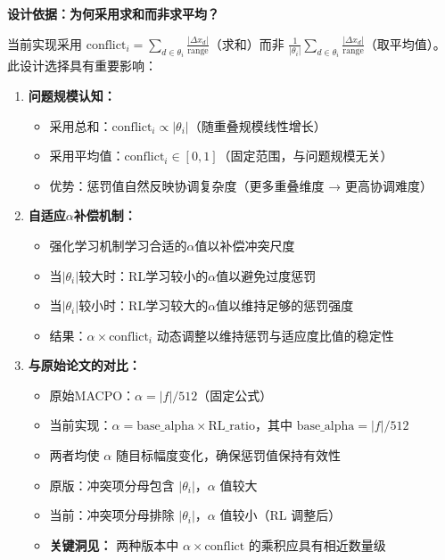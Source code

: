 \documentclass[11pt,a3paper]{ctexart}
\begin{document}
\textbf{设计依据：为何采用求和而非求平均？}

当前实现采用 $\text{conflict}_i = \sum_{d \in \theta_i} \frac{|Δx_d|}{\text{range}}$（求和）而非 $\frac{1}{|\theta_i|}\sum_{d \in \theta_i} \frac{|Δx_d|}{\text{range}}$（取平均值）。此设计选择具有重要影响：

\begin{enumerate}
\item \textbf{问题规模认知：}
   \begin{itemize}
        \item 采用总和：$\text{conflict}_i \propto |\theta_i|$（随重叠规模线性增长）
        \item 采用平均值：$\text{conflict}_i \in [0,1]$（固定范围，与问题规模无关）
        \item 优势：惩罚值自然反映协调复杂度（更多重叠维度 → 更高协调难度）
    \end{itemize}
    
\item \textbf{自适应$\alpha$补偿机制：}
    \begin{itemize}
        \item 强化学习机制学习合适的$\alpha$值以补偿冲突尺度
        \item 当$|\theta_i|$较大时：RL学习较小的$\alpha$值以避免过度惩罚
        \item 当$|\theta_i|$较小时：RL学习较大的$\alpha$值以维持足够的惩罚强度
        \item 结果：$\alpha \times \text{conflict}_i$ 动态调整以维持惩罚与适应度比值的稳定性
    \end{itemize}
    
\item \textbf{与原始论文的对比：}
    \begin{itemize}
        \item 原始MACPO：$\alpha = |f| / 512$（固定公式）
        \item 当前实现：$\alpha = \text{base\_alpha} \times \text{RL\_ratio}$，其中 $\text{base\_alpha} = |f| / 512$
        \item 两者均使 $\alpha$ 随目标幅度变化，确保惩罚值保持有效性
        \item 原版：冲突项分母包含 $|\theta_i|$，$\alpha$ 值较大
        \item 当前：冲突项分母排除 $|\theta_i|$，$\alpha$ 值较小（RL 调整后）
        \item \textbf{关键洞见：} 两种版本中 $\alpha \times \text{conflict}$ 的乘积应具有相近数量级
    \end{itemize}
    

\end{enumerate}
\end{document}
